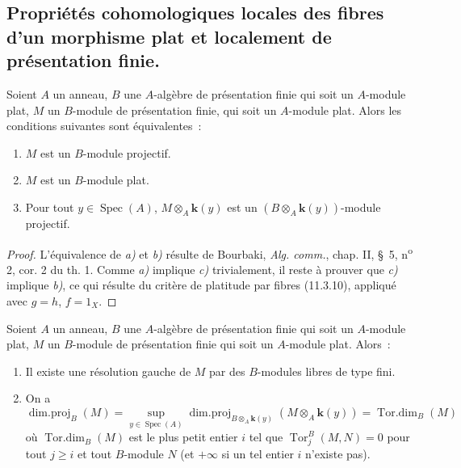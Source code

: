 \subsection{Propriétés cohomologiques locales des fibres d'un morphisme plat et
localement de présentation finie.}
\label{subsection:IV.12.3-fr}

\begin{lemma}[12.3.1]
\label{IV.12.3.1-fr}
Soient $A$ un anneau, $B$ une $A$-algèbre de présentation finie qui soit un
$A$-module plat, $M$ un $B$-module de présentation finie, qui soit un
$A$-module plat. Alors les conditions suivantes sont équivalentes~:
\begin{enumerate}[label=\emph{\alph*)}]
  \item $M$ est un $B$-module projectif.
  \item $M$ est un $B$-module plat.
  \item Pour tout $y\in\operatorname{Spec}(A)$, $M\otimes_A\boldsymbol{k}(y)$ est un
  $(B\otimes_A\boldsymbol{k}(y))$-module projectif.
\end{enumerate}
\end{lemma}

\begin{proof}
L'équivalence de \emph{a)} et \emph{b)} résulte de Bourbaki, \emph{Alg. comm.}, chap. II,
\S~5, n\textsuperscript{o} 2, cor. 2 du th. 1. Comme \emph{a)} implique \emph{c)}
trivialement, il reste à prouver que \emph{c)} implique \emph{b)}, ce qui résulte du
critère de platitude par fibres (11.3.10), appliqué avec $g=h$, $f=1_X$.
\end{proof}

\begin{proposition}[12.3.2]
\label{IV.12.3.2-fr}
Soient $A$ un anneau, $B$ une $A$-algèbre de présentation finie qui soit un
$A$-module plat, $M$ un $B$-module de présentation finie qui soit un
$A$-module plat. Alors~:
\begin{enumerate}[label=\textup{(\roman*)}]
  \item Il existe une résolution gauche de $M$ par des $B$-modules libres de
  type fini.
  \item On a
  \begin{equation}
    \tag{12.3.2.1}
    \label{IV.12.3.2.1-fr}
    \operatorname{dim.proj}_B(M)
    =\sup_{y\in\operatorname{Spec}(A)}
    \operatorname{dim.proj}_{B\otimes_A\mathbf{k}(y)}(M\otimes_A\boldsymbol{k}(y))
    =\operatorname{Tor.dim}_B(M)
  \end{equation}
  où $\operatorname{Tor.dim}_B(M)$ est le plus petit entier $i$ tel que
  $\operatorname{Tor}^B_j(M,N)=0$ pour tout $j\geq i$ et tout $B$-module $N$
  (et $+\infty$ si un tel entier $i$ n'existe pas).
\end{enumerate}
\end{proposition}

